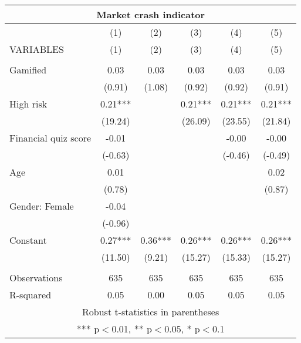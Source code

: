 \documentclass[]{article}
\begin{document}
\begin{tabular}{lccccc}
\multicolumn{6}{c}{Market crash indicator} \\ \hline
 & (1) & (2) & (3) & (4) & (5) \\
VARIABLES & (1) & (2) & (3) & (4) & (5) \\ \hline
 &  &  &  &  &  \\
Gamified & 0.03 & 0.03 & 0.03 & 0.03 & 0.03 \\
 & (0.91) & (1.08) & (0.92) & (0.92) & (0.91) \\
High risk & 0.21*** &  & 0.21*** & 0.21*** & 0.21*** \\
 & (19.24) &  & (26.09) & (23.55) & (21.84) \\
Financial quiz score & -0.01 &  &  & -0.00 & -0.00 \\
 & (-0.63) &  &  & (-0.46) & (-0.49) \\
Age & 0.01 &  &  &  & 0.02 \\
 & (0.78) &  &  &  & (0.87) \\
Gender: Female & -0.04 &  &  &  &  \\
 & (-0.96) &  &  &  &  \\
Constant & 0.27*** & 0.36*** & 0.26*** & 0.26*** & 0.26*** \\
 & (11.50) & (9.21) & (15.27) & (15.33) & (15.27) \\
 &  &  &  &  &  \\
Observations & 635 & 635 & 635 & 635 & 635 \\
 R-squared & 0.05 & 0.00 & 0.05 & 0.05 & 0.05 \\ \hline
\multicolumn{6}{c}{ Robust t-statistics in parentheses} \\
\multicolumn{6}{c}{ *** p$<$0.01, ** p$<$0.05, * p$<$0.1} \\
\end{tabular}
\end{document}
